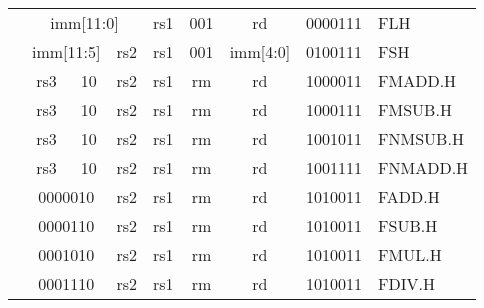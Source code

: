 \begin{table}[p]
\begin{small}
\begin{center}
\begin{tabular}{p{0in}p{0.4in}p{0.05in}p{0.05in}p{0.05in}p{0.05in}p{0.4in}p{0.6in}p{0.4in}p{0.6in}p{0.7in}l}
&
\multicolumn{6}{|c|}{imm[11:0]} &
\multicolumn{1}{c|}{rs1} &
\multicolumn{1}{c|}{001} &
\multicolumn{1}{c|}{rd} &
\multicolumn{1}{c|}{0000111} & FLH \\
\cline{2-11}


&
\multicolumn{4}{|c|}{imm[11:5]} &
\multicolumn{2}{c|}{rs2} &
\multicolumn{1}{c|}{rs1} &
\multicolumn{1}{c|}{001} &
\multicolumn{1}{c|}{imm[4:0]} &
\multicolumn{1}{c|}{0100111} & FSH \\
\cline{2-11}


&
\multicolumn{2}{|c|}{rs3} &
\multicolumn{2}{c|}{10} &
\multicolumn{2}{c|}{rs2} &
\multicolumn{1}{c|}{rs1} &
\multicolumn{1}{c|}{rm} &
\multicolumn{1}{c|}{rd} &
\multicolumn{1}{c|}{1000011} & FMADD.H \\
\cline{2-11}


&
\multicolumn{2}{|c|}{rs3} &
\multicolumn{2}{c|}{10} &
\multicolumn{2}{c|}{rs2} &
\multicolumn{1}{c|}{rs1} &
\multicolumn{1}{c|}{rm} &
\multicolumn{1}{c|}{rd} &
\multicolumn{1}{c|}{1000111} & FMSUB.H \\
\cline{2-11}


&
\multicolumn{2}{|c|}{rs3} &
\multicolumn{2}{c|}{10} &
\multicolumn{2}{c|}{rs2} &
\multicolumn{1}{c|}{rs1} &
\multicolumn{1}{c|}{rm} &
\multicolumn{1}{c|}{rd} &
\multicolumn{1}{c|}{1001011} & FNMSUB.H \\
\cline{2-11}


&
\multicolumn{2}{|c|}{rs3} &
\multicolumn{2}{c|}{10} &
\multicolumn{2}{c|}{rs2} &
\multicolumn{1}{c|}{rs1} &
\multicolumn{1}{c|}{rm} &
\multicolumn{1}{c|}{rd} &
\multicolumn{1}{c|}{1001111} & FNMADD.H \\
\cline{2-11}


&
\multicolumn{4}{|c|}{0000010} &
\multicolumn{2}{c|}{rs2} &
\multicolumn{1}{c|}{rs1} &
\multicolumn{1}{c|}{rm} &
\multicolumn{1}{c|}{rd} &
\multicolumn{1}{c|}{1010011} & FADD.H \\
\cline{2-11}


&
\multicolumn{4}{|c|}{0000110} &
\multicolumn{2}{c|}{rs2} &
\multicolumn{1}{c|}{rs1} &
\multicolumn{1}{c|}{rm} &
\multicolumn{1}{c|}{rd} &
\multicolumn{1}{c|}{1010011} & FSUB.H \\
\cline{2-11}


&
\multicolumn{4}{|c|}{0001010} &
\multicolumn{2}{c|}{rs2} &
\multicolumn{1}{c|}{rs1} &
\multicolumn{1}{c|}{rm} &
\multicolumn{1}{c|}{rd} &
\multicolumn{1}{c|}{1010011} & FMUL.H \\
\cline{2-11}


&
\multicolumn{4}{|c|}{0001110} &
\multicolumn{2}{c|}{rs2} &
\multicolumn{1}{c|}{rs1} &
\multicolumn{1}{c|}{rm} &
\multicolumn{1}{c|}{rd} &
\multicolumn{1}{c|}{1010011} & FDIV.H \\
\cline{2-11}



\end{tabular}
\end{center}
\end{small}
\end{table}
